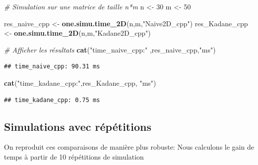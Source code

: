\documentclass[
]{article}
\newenvironment{Shaded}{\begin{snugshade}}{\end{snugshade}}
\newcommand{\CommentTok}[1]{\textcolor[rgb]{0.56,0.35,0.01}{\textit{#1}}}
\newcommand{\DecValTok}[1]{\textcolor[rgb]{0.00,0.00,0.81}{#1}}
\newcommand{\FunctionTok}[1]{\textcolor[rgb]{0.13,0.29,0.53}{\textbf{#1}}}
\newcommand{\NormalTok}[1]{#1}
\newcommand{\OtherTok}[1]{\textcolor[rgb]{0.56,0.35,0.01}{#1}}
\newcommand{\StringTok}[1]{\textcolor[rgb]{0.31,0.60,0.02}{#1}}
\begin{document}
\begin{Shaded}
\begin{Highlighting}[]
\CommentTok{\# Simulation sur une matrice de taille n*m}
\NormalTok{n }\OtherTok{\textless{}{-}} \DecValTok{30}
\NormalTok{m }\OtherTok{\textless{}{-}} \DecValTok{50}

\NormalTok{res\_naive\_cpp }\OtherTok{\textless{}{-}} \FunctionTok{one.simu.time\_2D}\NormalTok{(n,m,}\StringTok{"Naive2D\_cpp"}\NormalTok{)}
\NormalTok{res\_Kadane\_cpp }\OtherTok{\textless{}{-}} \FunctionTok{one.simu.time\_2D}\NormalTok{(n,m,}\StringTok{"Kadane2D\_cpp"}\NormalTok{)}

\CommentTok{\# Afficher les résultats}
\FunctionTok{cat}\NormalTok{(}\StringTok{"time\_naive\_cpp:"}\NormalTok{ ,res\_naive\_cpp,}\StringTok{"ms"}\NormalTok{)}
\end{Highlighting}
\end{Shaded}

\begin{verbatim}
## time_naive_cpp: 90.31 ms
\end{verbatim}

\begin{Shaded}
\begin{Highlighting}[]
\FunctionTok{cat}\NormalTok{(}\StringTok{"time\_kadane\_cpp:"}\NormalTok{,res\_Kadane\_cpp, }\StringTok{"ms"}\NormalTok{)}
\end{Highlighting}
\end{Shaded}

\begin{verbatim}
## time_kadane_cpp: 0.75 ms
\end{verbatim}

\subsection{Simulations avec
répétitions}\label{simulations-avec-ruxe9puxe9titions}

On reproduit ces comparaisons de manière plus robuste: Nous calculons le
gain de temps à partir de 10 répétitions de simulation
\end{document}
